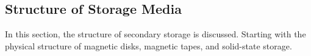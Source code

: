 \subsection{Structure of Storage Media}\label{subsec:Structure_Storage_Media}
In this section, the structure of secondary storage is discussed.
Starting with the physical structure of magnetic disks, magnetic tapes, and solid-state storage.


